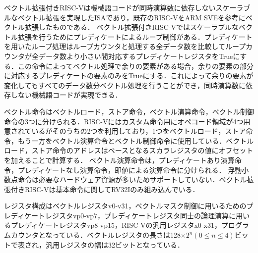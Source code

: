 
ベクトル拡張付きRISC-Vは機械語コードが同時演算数に依存しないスケーラブルなベクトル拡張を実現したISAであり，既存のRISC-VをARM SVEを参考にベクトル拡張したものである．
ベクトル拡張付きRISC-Vではスケーラブルなベクトル拡張を行うためにプレディケートによるループ制御がある．プレディケートを用いたループ処理はループカウンタと処理する全データ数を比較してループカウンタが全データ数より小さい間対応するプレディケートレジスタをTrueにする．この命令によってベクトル処理で余りの要素がある場合，余りの要素の部分に対応するプレディケートの要素のみをTrueにする．これによって余りの要素が変化してもすべてのデータ数分ベクトル処理を行うことができ，同時演算数に依存しない機械語コードが実現できる．

ベクトル命令はベクトルロード，ストア命令，ベクトル演算命令，ベクトル制御命令の3つに分けられる．RISC-Vにはカスタム命令用にオペコード領域が4つ用意されているがそのうちの2つを利用しており，1つをベクトルロード，ストア命令，もう一方をベクトル演算命令とベクトル制御命令に使用している．ベクトルロード，ストア命令のアドレスはベースとなるスカラレジスタの値にオフセットを加えることで計算する．
ベクトル演算命令は，プレディケートあり演算命令，プレディケートなし演算命令，即値による演算命令に分けられる．
浮動小数点命令は必要なハードウェア資源が多いためサポートしていない．ベクトル拡張付きRISC-Vは基本命令に関してRV32Iのみ組み込んでいる．

レジスタ構成はベクトルレジスタv0-v31，ベクトルマスク制御に用いるためのプレディケートレジスタvp0-vp7，プレディケートレジスタ同士の論理演算に用いるプレディケートレジスタvp8-vp15，RISC-Vの汎用レジスタx0-x31，プログラムカウンタとなっている．ベクトルレジスタの長さは128$\times 2^n(0\leq n\leq 4)$ビットで表され，汎用レジスタの幅は32ビットとなっている．